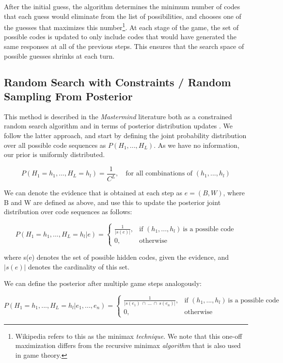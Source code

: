 \documentclass[11pt]{article}
\begin{document}
After the initial guess, the algorithm determines the minimum number of codes that each guess would eliminate from the list of possibilities, and chooses one of the guesses that maximizes this number\footnote{Wikipedia refers to this as the minimax \textit{technique}. We note that this one-off maximization differs from the recursive minimax \textit{algorithm} that is also used in game theory.}. At each stage of the game, the set of possible codes is updated to only include codes that would have generated the same responses at all of the previous steps. This ensures that the search space of possible guesses shrinks at each turn.

\subsection{Random Search with Constraints / Random Sampling From Posterior}

This method is described in the \textit{Mastermind} literature both as a constrained random search algorithm \cite{bernier1996solving} and in terms of posterior distribution updates \cite{vomlel2004bayesian}. We follow the latter approach, and start by defining the joint probability distribution over all possible code sequences as $P(H_1, ..., H_L)$. As we have no information, our prior is uniformly distributed.

\[
P(H_1=h_1, ..., H_L=h_l) = \frac{1}{C^L} ,\quad \text{for all combinations of }(h_1, ..., h_l)
\]

\noindent We can denote the evidence that is obtained at each step as $e = (B, W)$, where B and W are defined as above, and use this to update the posterior joint distribution over code sequences as follows:

\[
    P(H_1=h_1, ..., H_L=h_l | e) = 
\begin{cases}
    \frac{1}{|s(e)|},& \text{if } (h_1, ..., h_l) \ \text{is a possible code}\\
    0,              & \text{otherwise}
\end{cases}
\]

\noindent where s(e) denotes the set of possible hidden codes, given the evidence, and $|s(e)|$ denotes the cardinality of this set. \medskip

\noindent We can define the posterior after multiple game steps analogously:

\[
    P(H_1=h_1, ..., H_L=h_l | e_1, ..., e_n) = 
\begin{cases}
    \frac{1}{| s(e_1) \ \cap \ ... \ \cap \ s(e_n) |},& \text{if } (h_1, ..., h_l) \ \text{is a possible code}\\
    0,              & \text{otherwise}
\end{cases}
\]
\end{document}
